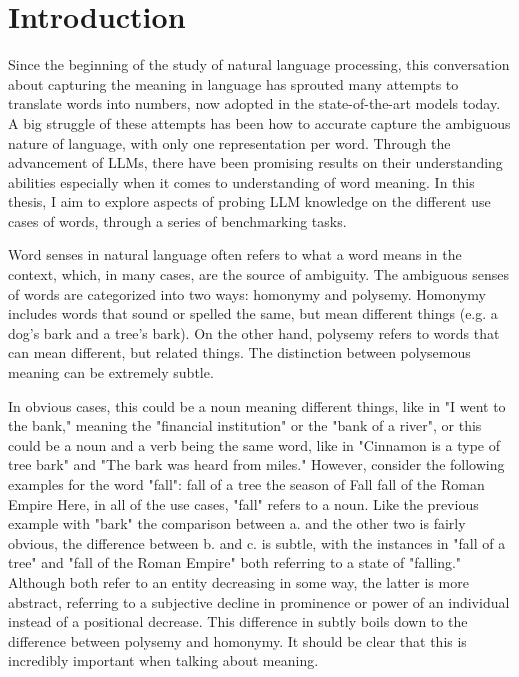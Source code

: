 \documentclass{brandeis-thesis3.2}
\theoremstyle{plain}
\theoremstyle{definition}
\theoremstyle{remark}
\numberwithin{equation}{section}
\begin{document}
\doublespacing

\tableofcontents
\clearpage

\listoftables
{}
\clearpage

\listoffigures
{}
\clearpage

\startbody

\chapter{Introduction}
Since the beginning of the study of natural language processing, this conversation about capturing the meaning in language has sprouted many attempts to translate words into numbers, now adopted in the state-of-the-art models today. A big struggle of these attempts has been how to accurate capture the ambiguous nature of language, with only one representation per word. Through the advancement of LLMs, there have been promising results on their understanding abilities especially when it comes to understanding of word meaning. In this thesis, I aim to explore aspects of probing LLM knowledge on the different use cases of words, through a series of benchmarking tasks.

Word senses in natural language often refers to what a word means in the context, which, in many cases, are the source of ambiguity. The ambiguous senses of words are categorized into two ways: homonymy and polysemy. Homonymy includes words that sound or spelled the same, but mean different things (e.g. a dog's bark and a tree's bark). On the other hand, polysemy refers to words that can mean different, but related things. The distinction between polysemous meaning can be extremely subtle.

In obvious cases, this could be a noun meaning different things, like in "I went to the bank," meaning the "financial institution" or the "bank of a river", or this could be a noun and a verb being the same word, like in "Cinnamon is a type of tree bark" and "The bark was heard from miles." However, consider the following examples for the word "fall":
\pex
\a fall of a tree
\a the season of Fall
\a fall of the Roman Empire
\xe
Here, in all of the use cases, "fall" refers to a noun. Like the previous example with "bark" the comparison between a. and the other two is fairly obvious, the difference between b. and c. is subtle, with the instances in "fall of a tree" and "fall of the Roman Empire" both referring to a state of "falling." Although both refer to an entity decreasing in some way, the latter is more abstract, referring to a subjective decline in prominence or power of an individual instead of a positional decrease. This difference in subtly boils down to the difference between polysemy and homonymy. It should be clear that this is incredibly important when talking about meaning.
\end{document}

